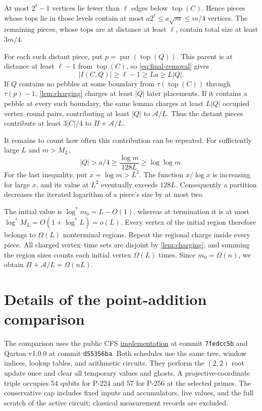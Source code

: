 \documentclass[11pt]{article}
\theoremstyle{definition}
\theoremstyle{remark}
\DeclareMathOperator{\parv}{par}
\DeclareMathOperator{\topv}{top}
\newcommand{\Area}{\mathcal A}
\begin{document}
At most $2^\ell-1$ vertices lie fewer than $\ell$ edges below $\topv(C)$. Hence pieces whose tops lie in those levels contain at most $a2^\ell\le a\sqrt m\le m/4$ vertices. The remaining pieces, whose tops are at distance at least $\ell$, contain total size at least $3m/4$.

For each such distant piece, put $p=\parv(\topv(Q))$. This parent is at distance at least $\ell-1$ from $\topv(C)$, so \cref{eq:final-removal} gives
\[
 |I(C,Q)|\ge\ell-1\ge La\ge L|Q|.
\]
If $Q$ contains no pebbles at some boundary from $\tau(\topv(C))$ through $\tau(p)-1$, \cref{lem:charging} charges at least $|Q|$ later placements. If it contains a pebble at every such boundary, the same lemma charges at least $L|Q|$ occupied vertex--round pairs, contributing at least $|Q|$ to $\Area/L$. Thus the distant pieces contribute at least $3|C|/4$ to $\Pi+\Area/L$.

It remains to count how often this contribution can be repeated. For sufficiently large $L$ and $m>M_L$,
\[
|Q|>a/4\ge\frac{\log m}{128L}\ge\log\log m.
\]
For the last inequality, put $x=\log m>L^2$. The function $x/\log x$ is increasing for large $x$, and its value at $L^2$ eventually exceeds $128L$. Consequently a partition decreases the iterated logarithm of a piece's size by at most two.

The initial value is $\log^*m_0=L-O(1)$, whereas at termination it is at most $\log^*M_L=O(1+\log^*L)=o(L)$. Every vertex of the initial region therefore belongs to $\Omega(L)$ nonterminal regions. Repeat the regional charge inside every piece. All charged vertex--time sets are disjoint by \cref{lem:charging}, and summing the region sizes counts each initial vertex $\Omega(L)$ times. Since $m_0=\Omega(n)$, we obtain $\Pi+\Area/L=\Omega(nL)$.

\section{Details of the point-addition comparison}
\label{app:application}

The comparison uses the public CFS \href{https://gitlab.inria.fr/capsule/qarton-projects/compressed-ec-dlog}{implementation} at commit \texttt{7fedcc5b} and Qarton v1.0.0 at commit \texttt{d55356ba}. Both schedules use the same tree, window indices, lookup tables, and arithmetic circuits. They perform the $(2,2)$ root update once and clear all temporary values and ghosts. A projective-coordinate triple occupies 54 qubits for P-224 and 57 for P-256 at the selected primes. The conservative cap includes fixed inputs and accumulators, live values, and the full scratch of the active circuit; classical measurement records are excluded.
\end{document}
